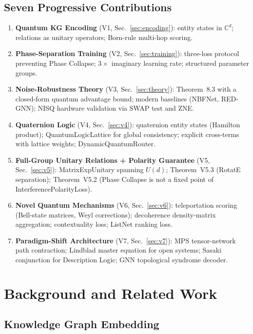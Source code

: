 \documentclass[runningheads]{llncs}
\newcommand{\CC}{\mathbb{C}}
\newcommand{\Ud}{U(d)}
\begin{document}
\subsection{Seven Progressive Contributions}

\begin{enumerate}
  \item \textbf{Quantum KG Encoding} (V1, Sec.~\ref{sec:encoding}):
    entity states in $\CC^d$; relations as unitary operators; Born-rule
    multi-hop scoring.
  \item \textbf{Phase-Separation Training} (V2, Sec.~\ref{sec:training}):
    three-loss protocol preventing Phase Collapse; $3\times$ imaginary
    learning rate; structured parameter groups.
  \item \textbf{Noise-Robustness Theory} (V3, Sec.~\ref{sec:theory}):
    Theorem~8.3 with a closed-form quantum advantage bound; modern baselines
    (NBFNet, RED-GNN); NISQ hardware validation via SWAP test and ZNE.
  \item \textbf{Quaternion Logic} (V4, Sec.~\ref{sec:v4}):
    quaternion entity states (Hamilton product); QuantumLogicLattice for
    global consistency; explicit cross-terms with lattice weights;
    DynamicQuantumRouter.
  \item \textbf{Full-Group Unitary Relations + Polarity Guarantee}
    (V5, Sec.~\ref{sec:v5}): MatrixExpUnitary spanning $\Ud$; Theorem~V5.3
    (RotatE separation); Theorem~V5.2 (Phase Collapse is not a fixed point
    of InterferencePolarityLoss).
  \item \textbf{Novel Quantum Mechanisms} (V6, Sec.~\ref{sec:v6}):
    teleportation scoring (Bell-state matrices, Weyl corrections); decoherence
    density-matrix aggregation; contextuality loss; ListNet ranking loss.
  \item \textbf{Paradigm-Shift Architecture} (V7, Sec.~\ref{sec:v7}):
    MPS tensor-network path contraction; Lindblad master equation for open
    systems; Sasaki conjunction for Description Logic; GNN topological
    syndrome decoder.
\end{enumerate}

\section{Background and Related Work}
\label{sec:related}

\subsection{Knowledge Graph Embedding}
\end{document}
